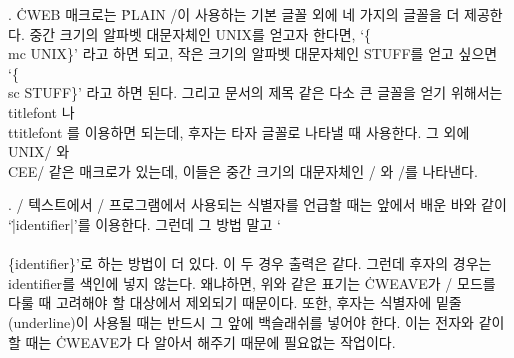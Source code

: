 {%
. \.{CWEB} 매크로는 \.{PLAIN} \TEX/이 사용하는 기본 글꼴
외에 네 가지의 글꼴을 더 제공한다. 중간 크기의 알파벳 대문자체인 {\mc
UNIX}를 얻고자 한다면, `\.{\{\\mc UNIX\}}' 라고 하면 되고,
작은 크기의 알파벳 대문자체인 {\sc STUFF}를 얻고 싶으면 `\.{\{\\sc
STUFF\}}' 라고 하면 된다. 그리고 문서의 제목 같은 다소 큰 글꼴을
얻기 위해서는 \.{\\titlefont} 나 \.{\\ttitlefont} 를 이용하면 되는데,
후자는 타자 글꼴로 나타낼 때 사용한다. 그 외에 \.{\\UNIX/} 와
\.{\\CEE/} 같은 매크로가 있는데, 이들은 중간 크기의 대문자체인 \UNIX/
와 \CEE/를 나타낸다.

. \TEX/ 텍스트에서 \CEE/ 프로그램에서 사용되는 식별자를 
언급할 때는 앞에서 배운 바와 같이 `\.{|identifier|}'를 이용한다. 
그런데 그 방법 말고 `\.{\\\\\{identifier\}}'로 하는 방법이 더 있다. 
이 두 경우 출력은 같다. 그런데 후자의 경우는 \\{identifier}를 
색인에 넣지 않는다. 왜냐하면, 위와 같은 표기는 \.{CWEAVE}가 \CEE/
모드를 다룰 때 고려해야 할 대상에서 제외되기 때문이다. 또한, 후자는 
식별자에 밑줄(underline)이 사용될 때는 반드시 그 앞에 백슬래쉬를
넣어야 한다. 이는 전자와 같이 할 때는 \.{CWEAVE}가 다 알아서 해주기
때문에 필요없는 작업이다.

}
